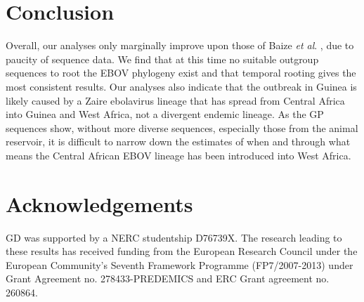 \documentclass[11pt,oneside,letterpaper]{article}
\begin{document}
\section*{Conclusion}
Overall, our analyses only marginally improve upon those of Baize \textit{et al}. \cite{baize2014}, due to paucity of sequence data. 
We find that at this time no suitable outgroup sequences to root the EBOV phylogeny exist and that temporal rooting gives the most consistent results.
Our analyses also indicate that the outbreak in Guinea is likely caused by a Zaire ebolavirus lineage that has spread from Central Africa into Guinea and West Africa, not a divergent endemic lineage.
As the GP sequences show, without more diverse sequences, especially those from the animal reservoir, it is difficult to narrow down the estimates of when and through what means the Central African EBOV lineage has been introduced into West Africa.

\section*{Acknowledgements}
GD was supported by a NERC studentship D76739X.
The research leading to these results has received funding from the European Research Council under the European Community's Seventh Framework Programme (FP7/2007-2013) under Grant Agreement no. 278433-PREDEMICS and ERC Grant agreement no. 260864.



\end{document}
